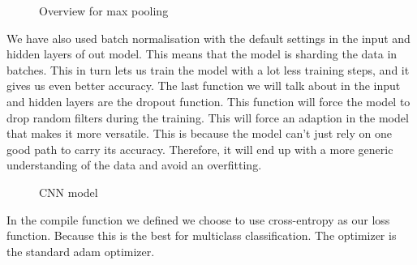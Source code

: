 \begin{figure}[h]
    \caption{Overview for max pooling~\cite{CNN}}
    \label{fig:Max pooling}
\end{figure}

We have also used batch normalisation with the default settings in the input and hidden layers of out model.
This means that the model is sharding the data in batches.
This in turn lets us train the model with a lot less training steps, and it gives us even better accuracy.
The last function we will talk about in the input and hidden layers are the dropout function.
This function will force the model to drop random filters during the training.
This will force an adaption in the model that makes it more versatile.
This is because the model can't just rely on one good path to carry its accuracy.
Therefore, it will end up with a more generic understanding of the data and avoid an overfitting.

\begin{figure}[h]
    \caption{CNN model}
    \label{fig:CNN model}
\end{figure}

In the compile function we defined we choose to use cross-entropy as our loss function.
Because this is the best for multiclass classification.
The optimizer is the standard adam optimizer.

